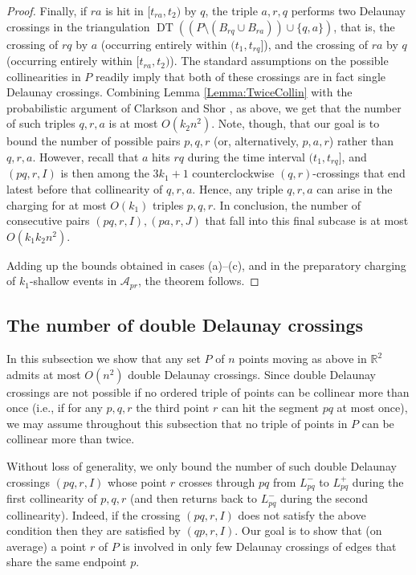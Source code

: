 \documentclass[letter,11pt]{article}
\def\A{\mathcal{A}}
\def \reals{{\mathbb R}}
\def \L{{L}}
\def\DT{\mathop{\mathrm{DT}}}
\begin{document}
\begin{proof}
Finally, if $ra$ is hit in $[t_{ra},t_{2})$ by $q$, the triple $a,r,q$ performs two Delaunay crossings in the triangulation $\DT((P\setminus (B_{rq}\cup B_{ra}))\cup \{q,a\})$, that is, the crossing of $rq$ by $a$ (occurring entirely within $(t_1,t_{rq}]$), and the crossing of $ra$ by $q$ (occurring entirely within $[t_{ra},t_2)$). The standard assumptions on the possible collinearities in $P$ readily imply that both of these crossings are in fact single Delaunay crossings.
Combining Lemma \ref{Lemma:TwiceCollin} with the probabilistic argument of Clarkson and Shor \cite{CS}, as above, we get that the number of such triples $q,r,a$ is at most $O(k_2n^2)$. Note, though, that our goal is to bound the number of possible pairs $p,q,r$ (or, alternatively, $p,a,r$) rather than $q,r,a$. However, recall that $a$ hits $rq$ during the time interval $(t_1,t_{rq}]$, and $(pq,r,I)$ is then among the $3k_1+1$ counterclockwise $(q,r)$-crossings that end latest before that collinearity of $q,r,a$. Hence, any triple $q,r,a$ can arise in the charging for at most $O(k_1)$ triples $p,q,r$. In conclusion, the number of consecutive pairs $(pq,r,I), (pa,r,J)$ that fall into this final subcase is at most $O(k_1k_2n^2)$. 

Adding up the bounds obtained in cases (a)--(c),  and in the preparatory charging of $k_1$-shallow events in $\A_{pr}$, the theorem follows.
\end{proof}

\subsection{The number of double Delaunay crossings}\label{Subsec:Double}
In this subsection we show that any set $P$ of $n$ points moving as above in $\reals^2$ admits at most $O(n^2)$ double Delaunay crossings.
Since double Delaunay crossings are not possible if no ordered triple of points can be collinear more than once
(i.e., if for any $p,q,r$ the third point $r$ can hit the segment $pq$ at most once), we may assume throughout this subsection that no triple of points in $P$ can be collinear more than twice.

Without loss of generality, we only bound the number of such double Delaunay crossings $(pq,r,I)$ whose point $r$ crosses through $pq$ from $\L_{pq}^-$ to $\L_{pq}^+$ during the first collinearity of $p,q,r$ (and then returns back to $\L_{pq}^-$ during the second collinearity).
Indeed, if the crossing $(pq,r,I)$ does not satisfy the above condition then they are satisfied by $(qp,r,I)$.
Our goal is to show that (on average) a point $r$ of $P$ is involved in only few Delaunay crossings of edges that share the same endpoint $p$.
\end{document}
